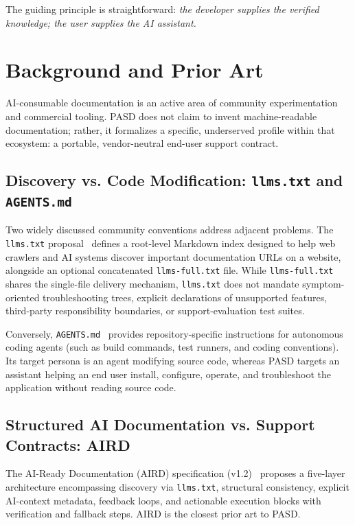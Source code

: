 \documentclass[12pt, a4paper]{article}
\begin{document}
The guiding principle is straightforward: \textit{the developer supplies the verified knowledge; the user supplies the AI assistant.}


\section{Background and Prior Art}
\label{sec:background}

AI-consumable documentation is an active area of community experimentation and commercial tooling. PASD does not claim to invent machine-readable documentation; rather, it formalizes a specific, underserved profile within that ecosystem: a portable, vendor-neutral end-user support contract.

\subsection{Discovery vs. Code Modification: \texttt{llms.txt} and \texttt{AGENTS.md}}
Two widely discussed community conventions address adjacent problems. The \texttt{llms.txt} proposal~\citep{howard2024llmstxt} defines a root-level Markdown index designed to help web crawlers and AI systems discover important documentation URLs on a website, alongside an optional concatenated \texttt{llms-full.txt} file. While \texttt{llms-full.txt} shares the single-file delivery mechanism, \texttt{llms.txt} does not mandate symptom-oriented troubleshooting trees, explicit declarations of unsupported features, third-party responsibility boundaries, or support-evaluation test suites.

Conversely, \texttt{AGENTS.md}~\citep{agentsmd2025} provides repository-specific instructions for autonomous coding agents (such as build commands, test runners, and coding conventions). Its target persona is an agent modifying source code, whereas PASD targets an assistant helping an end user install, configure, operate, and troubleshoot the application without reading source code.

\subsection{Structured AI Documentation vs. Support Contracts: AIRD}
The AI-Ready Documentation (AIRD) specification (v1.2)~\citep{aird2026} proposes a five-layer architecture encompassing discovery via \texttt{llms.txt}, structural consistency, explicit AI-context metadata, feedback loops, and actionable execution blocks with verification and fallback steps. AIRD is the closest prior art to PASD.
\end{document}
